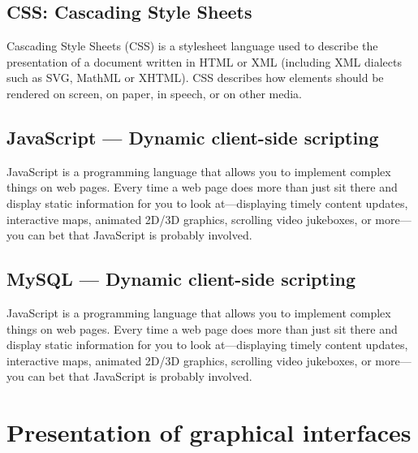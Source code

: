 \subsection{CSS: Cascading Style Sheets}
Cascading Style Sheets (CSS) is a stylesheet language used to describe the presentation of a document written in HTML or XML (including XML dialects such as SVG, MathML or XHTML). CSS describes how elements should be rendered on screen, on paper, in speech, or on other media.\cite{MDN-CSS}\\

\subsection{JavaScript — Dynamic client-side scripting}
JavaScript is a programming language that allows you to implement complex things on web pages. Every time a web page does more than just sit there and display static information for you to look at—displaying timely content updates, interactive maps, animated 2D/3D graphics, scrolling video jukeboxes, or more—you can bet that JavaScript is probably involved.\cite{MDN-JS}\\

\subsection{MySQL — Dynamic client-side scripting}
JavaScript is a programming language that allows you to implement complex things on web pages. Every time a web page does more than just sit there and display static information for you to look at—displaying timely content updates, interactive maps, animated 2D/3D graphics, scrolling video jukeboxes, or more—you can bet that JavaScript is probably involved.\cite{MDN-JS}\\





\section{Presentation of graphical interfaces}



